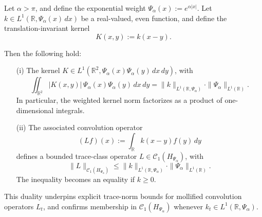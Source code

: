 \begin{lemma}
\label{lem:weighted_trace_norm_duality}
Let \( \alpha > \pi \), and define the exponential weight \( \Psi_\alpha(x) := e^{\alpha |x|} \). Let \( k \in L^1(\mathbb{R}, \Psi_\alpha(x)\, dx) \) be a real-valued, even function, and define the translation-invariant kernel
\[
K(x,y) := k(x - y).
\]

Then the following hold:
\begin{enumerate}
    \item[\textup{(i)}] The kernel \( K \in L^1(\mathbb{R}^2, \Psi_\alpha(x)\Psi_\alpha(y)\, dx\,dy) \), with
    \[
    \iint_{\mathbb{R}^2} |K(x,y)|\, \Psi_\alpha(x)\Psi_\alpha(y)\, dx\,dy
    = \|k\|_{L^1(\mathbb{R}, \Psi_\alpha)} \cdot \|\Psi_\alpha\|_{L^1(\mathbb{R})}.
    \]
    In particular, the weighted kernel norm factorizes as a product of one-dimensional integrals.

    \item[\textup{(ii)}] The associated convolution operator
    \[
    (L f)(x) := \int_{\mathbb{R}} k(x - y) f(y)\, dy
    \]
    defines a bounded trace-class operator \( L \in \mathcal{C}_1(H_{\Psi_\alpha}) \), with
    \[
    \| L \|_{\mathcal{C}_1(H_{\Psi_\alpha})}
    \le \|k\|_{L^1(\mathbb{R}, \Psi_\alpha)} \cdot \|\Psi_\alpha\|_{L^1(\mathbb{R})}.
    \]
    The inequality becomes an equality if \( k \ge 0 \).
\end{enumerate}

\medskip
\noindent
This duality underpins explicit trace-norm bounds for mollified convolution operators \( L_t \), and confirms membership in \( \mathcal{C}_1(H_{\Psi_\alpha}) \) whenever \( k_t \in L^1(\mathbb{R}, \Psi_\alpha) \).
\end{lemma}
